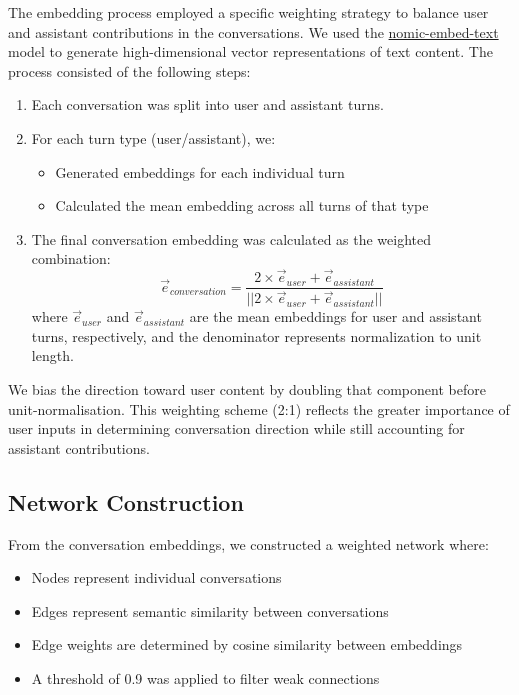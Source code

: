 \documentclass[10pt, a4paper]{article}
\begin{document}
The embedding process employed a specific weighting strategy to balance user and assistant contributions in the conversations. We used the \url{nomic-embed-text} model to generate high-dimensional vector representations of text content. The process consisted of the following steps:

\begin{enumerate}
    \item Each conversation was split into user and assistant turns.
    \item For each turn type (user/assistant), we:
    \begin{itemize}
        \item Generated embeddings for each individual turn
        \item Calculated the mean embedding across all turns of that type
    \end{itemize}
    \item The final conversation embedding was calculated as the weighted combination:
    \begin{equation}
    \vec{e}_{conversation} = \frac{2 \times \vec{e}_{user} + \vec{e}_{assistant}}{|\!|2 \times \vec{e}_{user} + \vec{e}_{assistant}|\!|}
    \end{equation}
    where $\vec{e}_{user}$ and $\vec{e}_{assistant}$ are the mean embeddings for user and assistant turns, respectively, and the denominator represents normalization to unit length.
\end{enumerate}

We bias the direction toward user content by doubling that component before unit-normalisation. This weighting scheme (2:1) reflects the greater importance of user inputs in determining conversation direction while still accounting for assistant contributions.

\subsection{Network Construction}

From the conversation embeddings, we constructed a weighted network where:
\begin{itemize}
    \item Nodes represent individual conversations
    \item Edges represent semantic similarity between conversations
    \item Edge weights are determined by cosine similarity between embeddings
    \item A threshold of 0.9 was applied to filter weak connections
\end{itemize}
\end{document}
